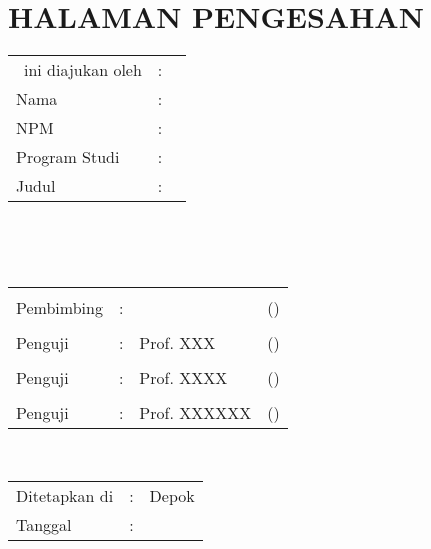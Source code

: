 %
%
%

\chapter*{HALAMAN PENGESAHAN}

\vspace*{0.4cm}
\noindent 

\noindent
\begin{tabular}{ll p{9cm}}
	\type~ini diajukan oleh&: & \\
	Nama&: & \penulis \\
	NPM&: & \npm \\
	Program Studi&: & \program \\
	Judul \type&: & \judul \\
\end{tabular} \\

\vspace*{1.0cm}

\noindent {}\\[0.2cm]

\begin{center}
\end{center}

\vspace*{0.3cm}

\begin{tabular}{l l l l }
	& & & \\
	Pembimbing&: & \pembimbing & (\hspace*{3.0cm}) \\
	& & & \\
	Penguji&: & Prof. XXX & (\hspace*{3.0cm}) \\
	& & & \\
	Penguji&: & Prof. XXXX & (\hspace*{3.0cm}) \\
	& & & \\
	Penguji&: & Prof. XXXXXX & (\hspace*{3.0cm}) \\
\end{tabular}\\


\vspace*{2.0cm}

\begin{tabular}{ll l}
	Ditetapkan di&: & Depok\\
	Tanggal&: & \tanggalLulus \\
\end{tabular}


\newpage